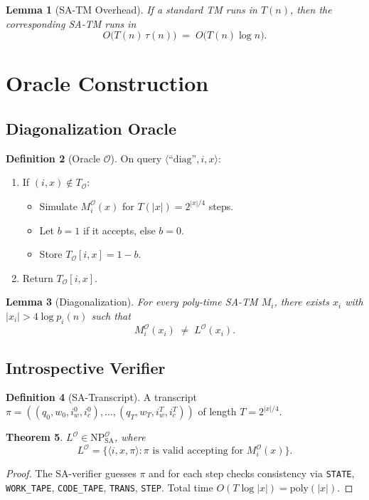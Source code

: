 \documentclass[12pt]{article}
\newcommand{\classNP}{\mathrm{NP}}
\newcommand{\SA}{\mathrm{SA}}
\newcommand{\OO}{\mathcal{O}}
\newcommand{\poly}{\mathrm{poly}}
\theoremstyle{definition}
\newtheorem{definition}{Definition}[section]
\theoremstyle{plain}
\newtheorem{theorem}[definition]{Theorem}
\newtheorem{lemma}[definition]{Lemma}
\begin{document}
\begin{lemma}[SA-TM Overhead]
If a standard TM runs in \(T(n)\), then the corresponding SA-TM runs in
\[
  O\bigl(T(n)\,\tau(n)\bigr) \;=\; O\bigl(T(n)\log n\bigr).
\]
\end{lemma}

\section{Oracle Construction}

\subsection{Diagonalization Oracle}

\begin{definition}[Oracle \(\OO\)]
On query \(\langle\text{“diag”},i,x\rangle\):
\begin{enumerate}
  \item If \((i,x)\notin T_{\OO}\):
    \begin{itemize}
      \item Simulate \(M_i^{\OO}(x)\) for \(T(|x|)=2^{|x|/4}\) steps.
      \item Let \(b=1\) if it accepts, else \(b=0\).
      \item Store \(T_{\OO}[i,x]=1-b\).
    \end{itemize}
  \item Return \(T_{\OO}[i,x]\).
\end{enumerate}
\end{definition}

\begin{lemma}[Diagonalization]
For every poly-time SA-TM \(M_i\), there exists \(x_i\) with
\(\lvert x_i\rvert>4\log p_i(n)\) such that
\[
  M_i^{\OO}(x_i)\;\neq\;L^{\OO}(x_i).
\]
\end{lemma}

\subsection{Introspective Verifier}

\begin{definition}[SA-Transcript]
A transcript 
\(\pi=( (q_0,w_0,i_w^0,i_c^0),\dots,(q_T,w_T,i_w^T,i_c^T))\)
of length \(T=2^{|x|/4}\).
\end{definition}

\begin{theorem}\label{thm:in-np}
\(L^{\OO}\in\classNP^{\OO}_{\SA}\), where
\[
  L^{\OO} = \{\langle i,x,\pi\rangle : \pi\text{ is valid accepting for }M_i^{\OO}(x)\}.
\]
\end{theorem}
\begin{proof}
The SA-verifier guesses \(\pi\) and for each step checks consistency via
\texttt{STATE}, \texttt{WORK\_TAPE}, \texttt{CODE\_TAPE},
\texttt{TRANS}, \texttt{STEP}.  
Total time \(O(T\log|x|)=\poly(|x|)\).
\end{proof}
\end{document}
